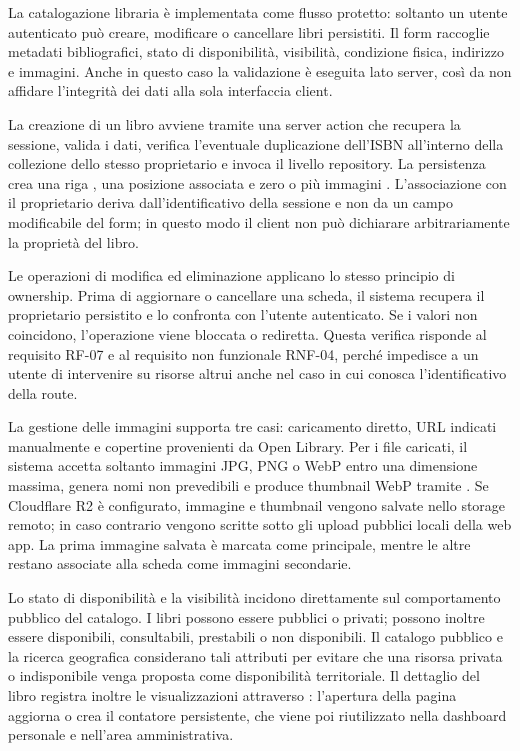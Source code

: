 La catalogazione libraria è implementata come flusso protetto: soltanto un utente autenticato può creare, modificare o cancellare libri persistiti. Il form raccoglie metadati bibliografici, stato di disponibilità, visibilità, condizione fisica, indirizzo e immagini. Anche in questo caso la validazione è eseguita lato server, così da non affidare l'integrità dei dati alla sola interfaccia client.

La creazione di un libro avviene tramite una server action che recupera la sessione, valida i dati, verifica l'eventuale duplicazione dell'ISBN all'interno della collezione dello stesso proprietario e invoca il livello repository. La persistenza crea una riga , una posizione associata  e zero o più immagini . L'associazione con il proprietario deriva dall'identificativo della sessione e non da un campo modificabile del form; in questo modo il client non può dichiarare arbitrariamente la proprietà del libro.

Le operazioni di modifica ed eliminazione applicano lo stesso principio di ownership. Prima di aggiornare o cancellare una scheda, il sistema recupera il proprietario persistito e lo confronta con l'utente autenticato. Se i valori non coincidono, l'operazione viene bloccata o rediretta. Questa verifica risponde al requisito RF-07 e al requisito non funzionale RNF-04, perché impedisce a un utente di intervenire su risorse altrui anche nel caso in cui conosca l'identificativo della route.

La gestione delle immagini supporta tre casi: caricamento diretto, URL indicati manualmente e copertine provenienti da Open Library. Per i file caricati, il sistema accetta soltanto immagini JPG, PNG o WebP entro una dimensione massima, genera nomi non prevedibili e produce thumbnail WebP tramite . Se Cloudflare R2 è configurato, immagine e thumbnail vengono salvate nello storage remoto; in caso contrario vengono scritte sotto gli upload pubblici locali della web app. La prima immagine salvata è marcata come principale, mentre le altre restano associate alla scheda come immagini secondarie.

Lo stato di disponibilità e la visibilità incidono direttamente sul comportamento pubblico del catalogo. I libri possono essere pubblici o privati; possono inoltre essere disponibili, consultabili, prestabili o non disponibili. Il catalogo pubblico e la ricerca geografica considerano tali attributi per evitare che una risorsa privata o indisponibile venga proposta come disponibilità territoriale. Il dettaglio del libro registra inoltre le visualizzazioni attraverso : l'apertura della pagina aggiorna o crea il contatore persistente, che viene poi riutilizzato nella dashboard personale e nell'area amministrativa.

